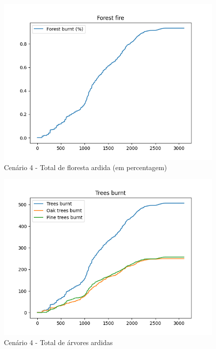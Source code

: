 \begin{figure}[H]
    \centering
    \includegraphics[width=\textwidth]{../src/runs/scenario4/forest_fire}
    \caption{Cenário 4 - Total de floresta ardida (em percentagem)}
    \label{fig:S4ForestBurnt}
\end{figure}

\begin{figure}[H]
    \centering
    \includegraphics[width=\textwidth]{../src/runs/scenario4/trees_burnt}
    \caption{Cenário 4 - Total de árvores ardidas}
    \label{fig:S4TreesBurnt}
\end{figure}

